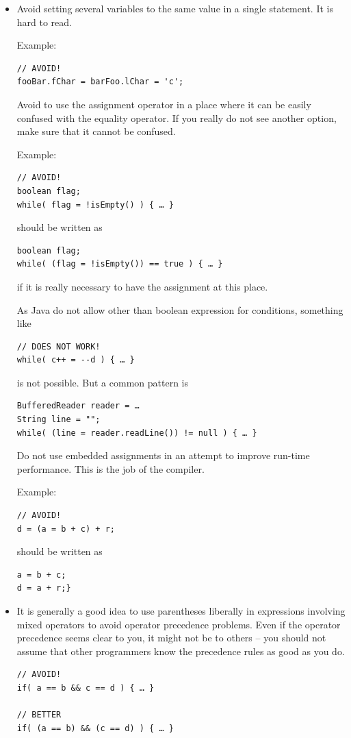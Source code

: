 \documentclass[11pt,a4paper, titlepage, parskip=half, headsepline, footsepline, cleardoublepage=current, headheight=1cm]{scrbook}
\begin{document}
\begin{itemize}
\item{Avoid setting several variables to the same value in a single statement. It is hard to read.

Example:
\begin{lstlisting}
// AVOID!
fooBar.fChar = barFoo.lChar = 'c'; 
\end{lstlisting}
Avoid to use the assignment operator in a place where it can be easily confused with the equality operator. If you really do not see another option, make sure that it cannot be confused.

Example:
\begin{lstlisting}
// AVOID!
boolean flag;
while( flag = !isEmpty() ) { … }
\end{lstlisting}
should be written as
\begin{lstlisting}
boolean flag;
while( (flag = !isEmpty()) == true ) { … }
\end{lstlisting}
if it is really necessary to have the assignment at this place.

As Java do not allow other than boolean expression for conditions, something like
\begin{lstlisting}
// DOES NOT WORK!
while( c++ = --d ) { … }
\end{lstlisting}
is not possible. But a common pattern is
\begin{lstlisting}
BufferedReader reader = …
String line = "";
while( (line = reader.readLine()) != null ) { … }
\end{lstlisting}
Do not use embedded assignments in an attempt to improve run-time performance. This is the job of the compiler. 

Example: 
\begin{lstlisting}
// AVOID!
d = (a = b + c) + r;        
\end{lstlisting}
should be written as 
\begin{lstlisting}
a = b + c;
d = a + r;}
\end{lstlisting}}

\item{It is generally a good idea to use parentheses liberally in expressions involving mixed operators to avoid operator precedence problems. Even if the operator precedence seems clear to you, it might not be to others – you should not assume that other programmers know the precedence rules as good as you do.
\begin{lstlisting}
// AVOID!
if( a == b && c == d ) { … }

// BETTER
if( (a == b) && (c == d) ) { … }
\end{lstlisting}

}
\end{itemize}
\end{document}
